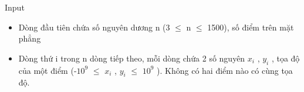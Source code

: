 Input
\begin{itemize}
	\item     Dòng đầu tiên chứa số nguyên dương n (3 $\le$ n $\le$ 1500), số điểm trên mặt phẳng   
	\item     Dòng thứ i trong n dòng tiếp theo, mỗi dòng chứa 2 số nguyên $x_{i}$    , $y_{i}$    , tọa độ của một điểm (-$10^{9}$     $\le$ $x_{i}$    , $y_{i}$     $\le$  $10^{9}$    ). Không có hai điểm nào có cùng tọa độ.   
\end{itemize}